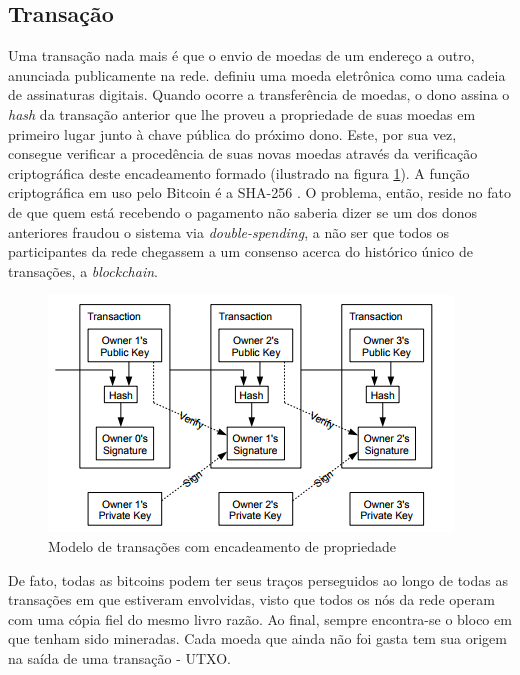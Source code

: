 \documentclass[a4paper,12pt]{monografia}
\theoremstyle{plain}
\theoremstyle{definition}
\theoremstyle{remark}
\begin{document}
\subsection{Transa\c{c}\~ao}

Uma transa\c{c}\~ao nada mais \'e que o envio de moedas de um endere\c{c}o a outro, anunciada publicamente  na rede.
 definiu uma moeda eletr\^onica como uma cadeia de assinaturas digitais.
Quando ocorre a transfer\^encia de moedas, o dono assina o \textit{hash} da transa\c{c}\~ao anterior que lhe proveu a propriedade de suas moedas em primeiro lugar junto \`a chave p\'ublica do pr\'oximo dono.
Este, por sua vez, consegue verificar a proced\^encia de suas novas moedas atrav\'es da verifica\c{c}\~ao criptogr\'afica deste encadeamento formado (ilustrado na figura \ref{fig:transaction}).
A fun\c{c}\~ao criptogr\'afica em uso pelo Bitcoin \'e a SHA-256 \cite{sha}.
O problema, ent\~ao, reside no fato de que quem est\'a recebendo o pagamento n\~ao saberia dizer se um dos donos anteriores fraudou o sistema via \textit{double-spending}, a n\~ao ser que todos os participantes da rede chegassem a um consenso acerca do hist\'orico \'unico de transa\c{c}\~oes, a \textit{blockchain}.

\begin{figure}[ht]
 \begin{center}
   \includegraphics{./figs/transaction.png}
   \caption{Modelo de transa\c{c}\~oes com encadeamento de propriedade}
   \label{fig:transaction}
 \end{center}
\end{figure}

De fato, todas as bitcoins podem ter seus tra\c{c}os perseguidos ao longo de todas as transa\c{c}\~oes em que estiveram envolvidas, visto que todos os n\'os da rede operam com uma c\'opia fiel do mesmo livro raz\~ao. Ao final, sempre encontra-se o bloco em que tenham sido mineradas. Cada moeda que ainda n\~ao foi gasta tem sua origem na sa\'ida de uma transa\c{c}\~ao - UTXO.
\end{document}
